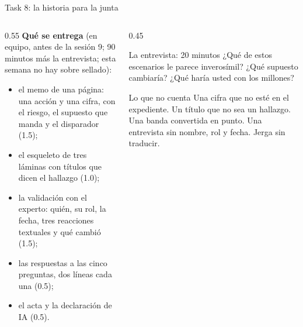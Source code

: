\documentclass{beamer}
\begin{document}
\begin{frame}{Task 8: la historia para la junta}
\begin{columns}[T]
\begin{column}{0.55\textwidth}
\small
\textbf{Qué se entrega} (en equipo, antes de la sesión 9; 90 minutos más la entrevista; esta semana no hay sobre sellado):
\begin{itemize}\itemsep3pt
  \item el memo de una página: una acción y una cifra, con el riesgo, el supuesto que manda y el disparador (1.5);
  \item el esqueleto de tres láminas con títulos que dicen el hallazgo (1.0);
  \item la validación con el experto: quién, su rol, la fecha, tres reacciones textuales y qué cambió (1.5);
  \item las respuestas a las cinco preguntas, dos líneas cada una (0.5);
  \item el acta y la declaración de IA (0.5).
\end{itemize}
\end{column}
\begin{column}{0.45\textwidth}
\begin{exampleblock}{La entrevista: 20 minutos}
\footnotesize ¿Qué de estos escenarios le parece inverosímil? ¿Qué supuesto cambiaría? ¿Qué haría usted con los  millones?
\end{exampleblock}
\begin{alertblock}{Lo que no cuenta}
\footnotesize Una cifra que no esté en el expediente. Un título que no sea un hallazgo. Una banda convertida en punto. Una entrevista sin nombre, rol y fecha. Jerga sin traducir.
\end{alertblock}
\end{column}
\end{columns}
\end{frame}
\end{document}
